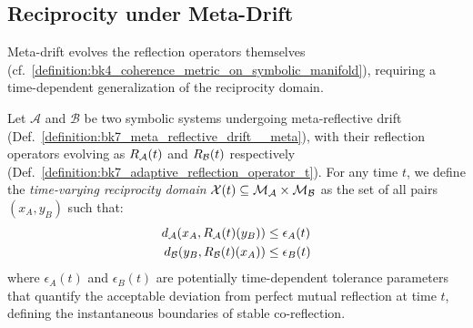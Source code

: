 \subsection{Reciprocity under Meta-Drift}
\label{subsec:bk7_reciprocity_under_meta_drift}
Meta-drift evolves the reflection operators themselves (cf.~\ref{definition:bk4_coherence_metric_on_symbolic_manifold}), requiring a time-dependent generalization of the reciprocity domain.
\begin{definition}
\label{definition:bk7_time_varying_reciprocity_domain}
Let \(\mathcal{A}\) and \(\mathcal{B}\) be two symbolic systems undergoing meta-reflective drift (Def.~\ref{definition:bk7_meta_reflective_drift__meta}), with their reflection operators evolving as \(R_{\mathcal{A}}(t)\) and \(R_{\mathcal{B}}(t)\) respectively (Def.~\ref{definition:bk7_adaptive_reflection_operator_t}). For any time \(t\), we define the \textit{time-varying reciprocity domain} \(\mathcal{X}(t) \subseteq \mathcal{M}_{\mathcal{A}}\times\mathcal{M}_{\mathcal{B}}\) as the set of all pairs \((x_A, y_B)\) such that:
\begin{align}
d_{\mathcal{A}}(x_A, R_{\mathcal{A}}(t)(y_B)) &\leq \epsilon_A(t)  \\
d_{\mathcal{B}}(y_B, R_{\mathcal{B}}(t)(x_A)) &\leq \epsilon_B(t) 
\end{align}
where \(\epsilon_A(t)\) and \(\epsilon_B(t)\) are potentially time-dependent tolerance parameters that quantify the acceptable deviation from perfect mutual reflection at time \(t\), defining the instantaneous boundaries of stable co-reflection.
\end{definition}
